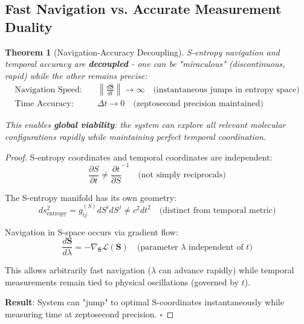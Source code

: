 \documentclass[12pt,a4paper]{article}
\newtheorem{theorem}{Theorem}[section]
\begin{document}
\subsection{Fast Navigation vs. Accurate Measurement Duality}

\begin{theorem}[Navigation-Accuracy Decoupling]
S-entropy navigation and temporal accuracy are \textbf{decoupled} - one can be "miraculous" (discontinuous, rapid) while the other remains precise:
\begin{align}
\text{Navigation Speed:} \quad &\left\|\frac{d\mathbf{S}}{dt}\right\| \to \infty \quad \text{(instantaneous jumps in entropy space)} \\
\text{Time Accuracy:} \quad &\Delta t \to 0 \quad \text{(zeptosecond precision maintained)}
\end{align}

This enables \textbf{global viability}: the system can explore all relevant molecular configurations rapidly while maintaining perfect temporal coordination.
\end{theorem}

\begin{proof}
S-entropy coordinates and temporal coordinates are independent:
\begin{equation}
\frac{\partial S}{\partial t} \neq \frac{\partial t}{\partial S}^{-1} \quad \text{(not simply reciprocals)}
\end{equation}

The S-entropy manifold has its own geometry:
\begin{equation}
ds^2_{\text{entropy}} = g_{ij}^{(S)} dS^i dS^j \neq c^2 dt^2 \quad \text{(distinct from temporal metric)}
\end{equation}

Navigation in S-space occurs via gradient flow:
\begin{equation}
\frac{d\mathbf{S}}{d\lambda} = -\nabla_{\mathbf{S}} \mathcal{L}(\mathbf{S}) \quad \text{(parameter } \lambda \text{ independent of } t)
\end{equation}

This allows arbitrarily fast navigation ($\lambda$ can advance rapidly) while temporal measurements remain tied to physical oscillations (governed by $t$).

\textbf{Result}: System can "jump" to optimal S-coordinates instantaneously while measuring time at zeptosecond precision. $\square$
\end{proof}
\end{document}
